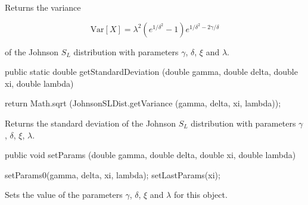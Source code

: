 \begin{tabb}  Returns the variance
\begin{latexonly}
    \[\mbox{Var}[X] = \lambda^2 \left(e^{1/\delta^2} - 1\right)
      e^{1/\delta^2 - 2\gamma/\delta}\]
\end{latexonly}%
   of the Johnson $S_L$ distribution with parameters $\gamma$, $\delta$, $\xi$
   and $\lambda$.
\end{tabb}
\begin{htmlonly}
\end{htmlonly}
\begin{code}

   public static double getStandardDeviation (double gamma, double delta,
                                              double xi, double lambda)\begin{hide} {
      return Math.sqrt (JohnsonSLDist.getVariance (gamma, delta, xi, lambda));
   }\end{hide}
\end{code}
\begin{tabb}  Returns the standard deviation of the Johnson $S_L$
   distribution with parameters $\gamma$, $\delta$, $\xi$, $\lambda$.
\end{tabb}
\begin{htmlonly}
\end{htmlonly}
\begin{code}

   public void setParams (double gamma, double delta,
                          double xi, double lambda)\begin{hide} {
      setParams0(gamma, delta, xi, lambda);
      setLastParams(xi);
   }\end{hide}
\end{code}
  \begin{tabb}
  Sets the value of the parameters $\gamma$, $\delta$, $\xi$ and
  $\lambda$ for this object.
 \end{tabb}

\begin{code}\begin{hide}
}\end{hide}
\end{code}
